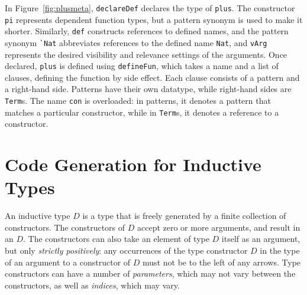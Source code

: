 \documentclass[runningheads]{llncs}
\begin{document}

%

In Figure~\ref{fig:plusmeta}, {\tt declareDef} declares the type of {\tt plus}.
The constructor {\tt pi} represents dependent function types, but a pattern synonym is used to make it shorter.
Similarly, \texttt{def} constructs references to defined names, and the pattern synonym \Verb|`Nat| abbreviates references to the defined name \texttt{Nat}, and {\tt vArg} represents the desired visibility and relevance settings of the arguments.
Once declared, \texttt{plus} is defined using {\tt defineFun}, which takes a name and a list of clauses, defining the function by side effect.
Each clause consists of a pattern and a right-hand side.
Patterns have their own datatype, while right-hand sides are \texttt{Term}s.
The name \texttt{con} is overloaded: in patterns, it denotes a pattern that matches a particular constructor, while in \texttt{Term}s, it denotes a reference to a constructor.


\section{Code Generation for Inductive Types}
\label{sec:sec3}
An inductive type $D$ is a type that is freely generated by a finite collection of constructors. The constructors of $D$ accept zero or more arguments, and result in an $D$. The constructors can also take an element of type $D$ itself as an argument, but only \emph{strictly positively}: any occurrences of the type constructor $D$ in the type of an argument to a constructor of $D$ must not be to the left of any arrows.
Type constructors can have a number of \emph{parameters}, which may not vary between the constructors, as well as \emph{indices}, which may vary.
\end{document}
